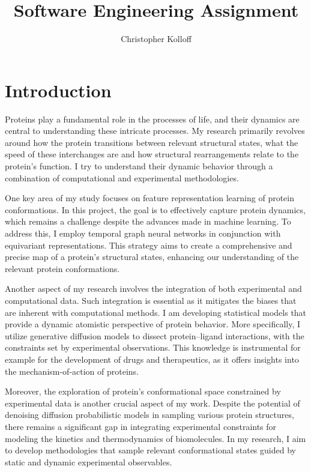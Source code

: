\documentclass[11pt,a4paper]{article}
\title{Software Engineering Assignment}
\author{Christopher Kolloff}
\begin{document}
\maketitle

\section{Introduction}
Proteins play a fundamental role in the processes of life, and their dynamics are central to understanding these intricate processes. My research primarily revolves around how the protein transitions between relevant structural states, what the speed of these interchanges are and how structural rearrangements relate to the protein’s function. I try to understand their dynamic behavior through a combination of computational and experimental methodologies.

One key area of my study focuses on feature representation learning of protein conformations. In this project, the goal is to effectively capture protein dynamics, which remains a challenge despite the advances made in machine learning. To address this, I employ temporal graph neural networks in conjunction with equivariant representations. This strategy aims to create a comprehensive and precise map of a protein's structural states, enhancing our understanding of the relevant protein conformations.

Another aspect of my research involves the integration of both experimental and computational data. Such integration is essential as it mitigates the biases that are inherent with computational methods. I am developing statistical models that provide a dynamic atomistic perspective of protein behavior. More specifically, I utilize generative diffusion models to dissect protein--ligand interactions, with the constraints set by experimental observations. This knowledge is instrumental for example for the development of drugs and therapeutics, as it offers insights into the mechanism-of-action of proteins.

Moreover, the exploration of protein's conformational space constrained by experimental data is another crucial aspect of my work. Despite the potential of denoising diffusion probabilistic models in sampling various protein structures, there remains a significant gap in integrating experimental constraints for modeling the kinetics and thermodynamics of biomolecules. In my research, I aim to develop methodologies that sample relevant conformational states guided by static and dynamic experimental observables.
\end{document}
